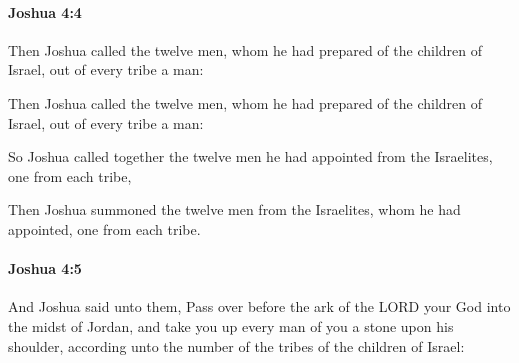		\paragraph{Joshua 4:4} %
			\label{JOSHUA-4-4}

			Then Joshua called the twelve men, whom he had prepared of the children of Israel, out of every tribe a man:

			\begin{versebox}
					\item[BHS] 
					\item[ASV] Then Joshua called the twelve men, whom he had prepared of the children of Israel, out of every tribe a man:
					\item[NIV] So Joshua called together the twelve men he had appointed from the Israelites, one from each tribe,
					\item[NRSV] Then Joshua summoned the twelve men from the Israelites, whom he had appointed, one from each tribe.
			\end{versebox}

		\paragraph{Joshua 4:5} %
			\label{JOSHUA-4-5}

			And Joshua said unto them, Pass over before the ark of the LORD your God into the midst of Jordan, and take you up every man of you a stone upon his shoulder, according unto the number of the tribes of the children of Israel:

